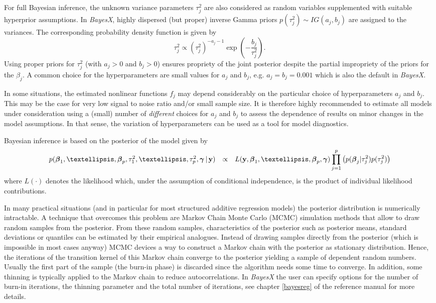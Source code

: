 \documentclass[11pt,a4paper,twoside]{bayesxarticle}
\begin{document}
For full Bayesian inference, the unknown variance parameters
$\tau_j^2$ are also considered as random variables supplemented with
suitable hyperprior assumptions. In {\em BayesX}, highly dispersed
(but proper) inverse Gamma priors $p(\tau^2_j) \sim IG(a_j,b_j)$ are
assigned to the variances. The corresponding probability density
function is given by
$$
 \tau_j^2 \propto (\tau^2_j)^{-a_j-1}\exp\left(-\frac{b_j}{\tau^2_j}\right).
$$
Using proper priors for $\tau_j^2$ (with $a_j>0$ and $b_j>0$)
ensures propriety of the joint posterior despite the partial
impropriety of the priors for the $\beta_j$. A common choice for the
hyperparameters are small values for $a_j$ and $b_j$, e.g.
$a_j=b_j=0.001$ which is also the default in {\em BayesX}.

In some situations, the estimated nonlinear functions $f_j$ may
depend considerably on the particular choice of hyperparameters
$a_j$ and $b_j$. This may be the case for very low signal to noise
ratio and/or small sample size. It is therefore highly recommended
to estimate all models under consideration using a (small) number of
{\em different} choices for $a_j$ and $b_j$ to assess the dependence
of results on minor changes in the model assumptions. In that sense,
the variation of hyperparameters can be used as a tool for model
diagnostics.

Bayesian inference is based on the posterior of the model given by
\begin{equation}
\label{posterior}
\begin{array}{lll}
 p(\betavec_1,\dots,\betavec_p,\tau^2_1,\dots,\tau^2_p,\gammavec \, | \, \yvec) & \propto & L(\yvec,\betavec_1,\dots,\betavec_p, \gammavec )
\displaystyle \prod_{j=1}^p \left( p(\betavec_j|\tau_j^2) p(\tau^2_j)
\right)
 \end{array}
\end{equation}
where  $L(\cdot)$ denotes the likelihood which, under the assumption
of conditional independence, is the product of individual likelihood
contributions.

In many practical situations (and in particular for most structured
additive regression models) the posterior distribution is
numerically intractable. A technique that overcomes this problem are
Markov Chain Monte Carlo (MCMC) simulation methods that allow to
draw random samples from the posterior. From these random samples,
characteristics of the posterior such as posterior means, standard
deviations or quantiles can be estimated by their empirical
analogues. Instead of drawing samples directly from the posterior
(which is impossible in most cases anyway) MCMC devices a way to
construct a Markov chain with the posterior as stationary
distribution. Hence, the iterations of the transition kernel of this
Markov chain converge to the posterior yielding a sample of
dependent random numbers. Usually the first part of the sample (the
burn-in phase) is discarded since the algorithm needs some time to
converge. In addition, some thinning is typically applied to the
Markov chain to reduce autocorrelations. In {\em BayesX} the user
can specify options for the number of burn-in iterations, the
thinning parameter and the total number of iterations, see chapter
\ref*{bayesreg} of the reference manual for more details.
\end{document}
